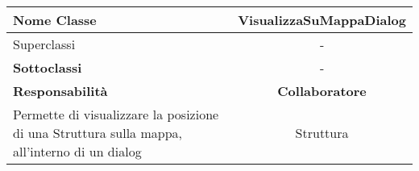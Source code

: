 
\setcounter{table}{0}
\begin{table}[H]
    \centering
    \begin{tabular}{||   l  ||  c   ||}
        \hline
        \rowcolor{Gray}
        \textbf{Nome Classe} & VisualizzaSuMappaDialog\\
        \hline
        Superclassi  &  - \\
        \hline
        \textbf{Sottoclassi} & - \\
        \hline
         \textbf{Responsabilità} & \textbf{Collaboratore} \\
         \hline
         Permette di visualizzare la posizione di una Struttura sulla mappa, all'interno di un dialog& Struttura \\
         \hline
    \end{tabular}
\end{table}
